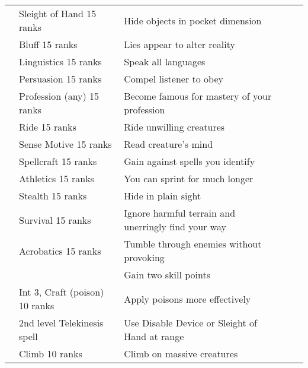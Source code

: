 \begin{longtabuwrapper}
\begin{longtabu}{>{\lcol}p{10em} >{\lcol}p{15em} >{\lcol}X >{\lcol}p{8em} >{\lcol}p{3em}}
         & Sleight of Hand 15 ranks & Hide objects in pocket dimension & \x &  \\
         & Bluff 15 ranks & Lies appear to alter reality & \x &  \\
         & Linguistics 15 ranks & Speak all languages & \x &  \\
         & Persuasion 15 ranks & Compel listener to obey & \x &  \\
         & Profession (any) 15 ranks & Become famous for mastery of your profession & \x &  \\
         & Ride 15 ranks & Ride unwilling creatures & \x &  \\
         & Sense Motive 15 ranks & Read creature's mind & \x &  \\
         & Spellcraft 15 ranks & Gain  against spells you identify & \x &  \\
         & Athletics 15 ranks & You can sprint for much longer & \x &  \\
         & Stealth 15 ranks & Hide in plain sight & \x &  \\
         & Survival 15 ranks & Ignore harmful terrain and unerringly find your way & \x &  \\
         & Acrobatics 15 ranks & Tumble through enemies without provoking & \x &  \\
         & \x & Gain two skill points & \x &  \\
         & Int 3, Craft (poison) 10 ranks & Apply poisons more effectively & \x &  \\
         &  2nd level Telekinesis spell & Use Disable Device or Sleight of Hand at range & \x &  \\
         & Climb 10 ranks & Climb on massive creatures & \x &  \\

\end{longtabu}
\end{longtabuwrapper}

